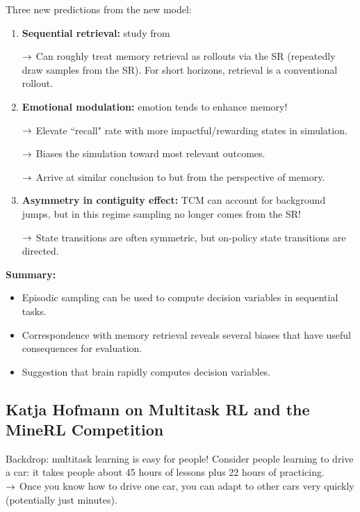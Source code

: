 Three new predictions from the new model:
\begin{enumerate}
    \item {\bf Sequential retrieval:} study from~\citet{preston2013interplay}
    
    $\rightarrow$ Can roughly treat memory retrieval as rollouts via the SR (repeatedly draw samples from the SR). For short horizons, retrieval is a conventional rollout.
    
    \item {\bf Emotional modulation:} emotion tends to enhance memory!
    
    $\rightarrow$ Elevate ``recall" rate with more impactful/rewarding states in simulation.
    
    $\rightarrow$ Biases the simulation toward most relevant outcomes.
    
    $\rightarrow$ Arrive at similar conclusion to \citet{lieder2019resource} but from the perspective of memory.
    \item {\bf Asymmetry in contiguity effect:} TCM can account for background jumps, but in this regime sampling no longer comes from the SR!
    
    $\rightarrow$ State transitions are often symmetric, but on-policy state transitions are directed.

\end{enumerate}

{\bf Summary:}
\begin{itemize}
    \item Episodic sampling can be used to compute decision variables in sequential tasks.
    \item Correspondence with memory retrieval reveals several biases that have useful consequences for evaluation.
    \item Suggestion that brain rapidly computes decision variables.
\end{itemize}

\spacerule


\subsection{Katja Hofmann on Multitask RL and the MineRL Competition}
\label{sec:kh}

Backdrop: multitask learning is easy for people! Consider people learning to drive a car: it takes people about 45 hours of lessons plus 22 hours of practicing. \\

$\rightarrow$ Once you know how to drive one car, you can adapt to other cars very quickly (potentially just minutes). \\


